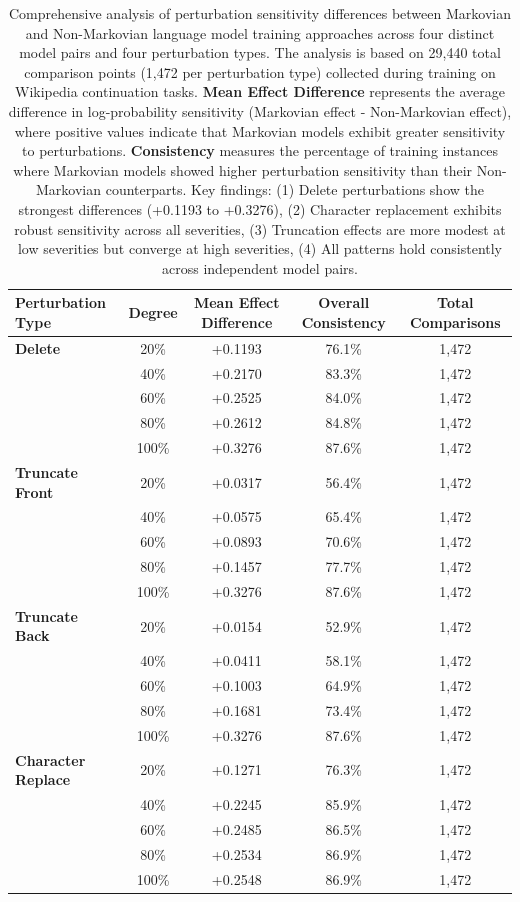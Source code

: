 \documentclass{article} %
\begin{document}
\begin{table}[ht]
  \centering
\small
\begin{tabular}{lcccc}
\hline
\textbf{Perturbation Type} & \textbf{Degree} & \textbf{Mean Effect Difference} & \textbf{Overall Consistency} & \textbf{Total Comparisons} \\
\hline
\textbf{Delete} & 20\% & +0.1193 & 76.1\% & 1,472 \\
& 40\% & +0.2170 & 83.3\% & 1,472 \\
& 60\% & +0.2525 & 84.0\% & 1,472 \\
& 80\% & +0.2612 & 84.8\% & 1,472 \\
& 100\% & +0.3276 & 87.6\% & 1,472 \\
\hline
\textbf{Truncate Front} & 20\% & +0.0317 & 56.4\% & 1,472 \\
& 40\% & +0.0575 & 65.4\% & 1,472 \\
& 60\% & +0.0893 & 70.6\% & 1,472 \\
& 80\% & +0.1457 & 77.7\% & 1,472 \\
& 100\% & +0.3276 & 87.6\% & 1,472 \\
\hline
\textbf{Truncate Back} & 20\% & +0.0154 & 52.9\% & 1,472 \\
& 40\% & +0.0411 & 58.1\% & 1,472 \\
& 60\% & +0.1003 & 64.9\% & 1,472 \\
& 80\% & +0.1681 & 73.4\% & 1,472 \\
& 100\% & +0.3276 & 87.6\% & 1,472 \\
\hline
\textbf{Character Replace} & 20\% & +0.1271 & 76.3\% & 1,472 \\
& 40\% & +0.2245 & 85.9\% & 1,472 \\
& 60\% & +0.2485 & 86.5\% & 1,472 \\
& 80\% & +0.2534 & 86.9\% & 1,472 \\
& 100\% & +0.2548 & 86.9\% & 1,472 \\
\hline
\end{tabular}
\caption{Comprehensive analysis of perturbation sensitivity differences between Markovian and Non-Markovian language model training approaches across four distinct model pairs and four perturbation types. The analysis is based on 29,440 total comparison points (1,472 per perturbation type) collected during training on Wikipedia continuation tasks. \textbf{Mean Effect Difference} represents the average difference in log-probability sensitivity (Markovian effect - Non-Markovian effect), where positive values indicate that Markovian models exhibit greater sensitivity to perturbations. \textbf{Consistency} measures the percentage of training instances where Markovian models showed higher perturbation sensitivity than their Non-Markovian counterparts. Key findings: (1) Delete perturbations show the strongest differences (+0.1193 to +0.3276), (2) Character replacement exhibits robust sensitivity across all severities, (3) Truncation effects are more modest at low severities but converge at high severities, (4) All patterns hold consistently across independent model pairs.}
\label{tab:markovian_comparison}
\end{table}
\end{document}
